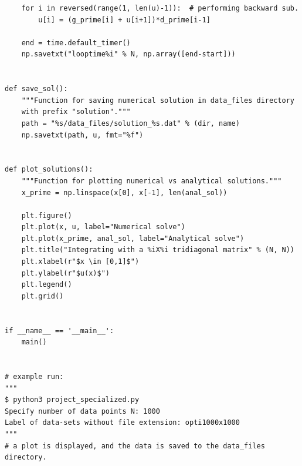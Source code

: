 \documentclass[english,notitlepage,reprint]{revtex4-1}  %
\begin{document}
\begin{lstlisting}
    for i in reversed(range(1, len(u)-1)):  # performing backward sub.
        u[i] = (g_prime[i] + u[i+1])*d_prime[i-1]

    end = time.default_timer()
    np.savetxt("looptime%i" % N, np.array([end-start]))


def save_sol():
    """Function for saving numerical solution in data_files directory
    with prefix "solution"."""
    path = "%s/data_files/solution_%s.dat" % (dir, name)
    np.savetxt(path, u, fmt="%f")


def plot_solutions():
    """Function for plotting numerical vs analytical solutions."""
    x_prime = np.linspace(x[0], x[-1], len(anal_sol))

    plt.figure()
    plt.plot(x, u, label="Numerical solve")
    plt.plot(x_prime, anal_sol, label="Analytical solve")
    plt.title("Integrating with a %iX%i tridiagonal matrix" % (N, N))
    plt.xlabel(r"$x \in [0,1]$")
    plt.ylabel(r"$u(x)$")
    plt.legend()
    plt.grid()


if __name__ == '__main__':
    main()


# example run:
"""
$ python3 project_specialized.py
Specify number of data points N: 1000
Label of data-sets without file extension: opti1000x1000
"""
# a plot is displayed, and the data is saved to the data_files directory.

\end{lstlisting}
\end{document}
